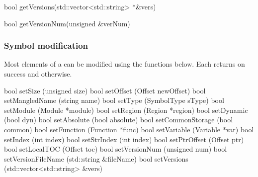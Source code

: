 \begin{apient}
bool getVersions(std::vector<std::string> *&vers)
\end{apient}

\begin{apient}
bool getVersionNum(unsigned &verNum)
\end{apient}

\subsubsection{Symbol modification}

Most elements of a  can be modified using the functions below. Each returns  on success and  otherwise. 

\begin{apient}
bool setSize (unsigned size)
bool setOffset (Offset newOffset)
bool setMangledName (string name)
bool setType (SymbolType sType)
bool setModule (Module *module)
bool setRegion (Region *region)
bool setDynamic (bool dyn)
bool setAbsolute (bool absolute)
bool setCommonStorage (bool common) 
bool setFunction (Function *func)
bool setVariable (Variable *var)
bool setIndex (int index)
bool setStrIndex (int index)
bool setPtrOffset (Offset ptr)
bool setLocalTOC (Offset toc)
bool setVersionNum (unsigned num)
bool setVersionFileName (std::string &fileName)
bool setVersions (std::vector<std::string> &vers)
\end{apient}
